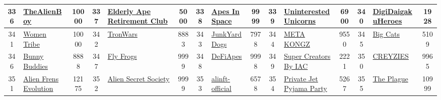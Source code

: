 \begin{table*}[]
{\begin{tabular}{|c|l|c|c|l|c|c|l|c|c|l|c|c|l|c|}
        336   & \href{https://www.thealienboy.com/}{TheAlienBoy}                                   & 10000             & 337   & \href{https://earclubnft.com/}{Elderly Ape Retirement Club}                                       & 5000              & 338   & \href{https://apesinspace.io/}{Apes In Space}                                     & 9999              & 339   & \href{https://uunicorns.io}{UninterestedUnicorns}                             & 6900              & 340   & \href{https://digidaigaku.com/}{DigiDaigakuHeroes}                                        & 1928                                    \\ \hline
        341   & \href{http://womentribe.art}{Women Tribe}                                          & 10000             & 342   & \href{https://tronwars.ai}{TronWars}                                                              & 8883              & 343   & \href{http://junkyarddogs.io}{JunkYardDogs}                                       & 7978              & 344   & \href{https://themetakongz.com/}{META KONGZ}                                  & 9550              & 345   & \href{https://8lives.io/}{Big Cats}                                                       & 5109                                    \\ \hline
        346   & \href{https://bunny-buddies.com/}{Bunny Buddies}                                   & 8888              & 347   & \href{https://flyfrogs.xyz}{Fly Frogs}                                                            & 9999              & 348   & \href{http://ape.fi}{DeFiApes}                                                    & 9998              & 349   & \href{https://supercreators.io/}{Super Creators By IAC}                       & 2221              & 350   & \href{https://opensea.io/collection/creyzies}{CREYZIES}                                   & 9965                                    \\ \hline
        351   & \href{http://alienfrens.io}{Alien Frens Evolution}                                 & 12175             & 352   & \href{https://www.aliensecretsociety.com}{Alien Secret Society}                                   & 9999              & 353   & \href{http://www.alinft.io}{alinft-official}                                      & 6578              & 354   & \href{http://www.pjpp.io}{Private Jet Pyjama Party}                           & 5267              & 355   & \href{https://opensea.io/collection/slokh}{The Plague}                                    & 10999                                   \\ \hline

\end{tabular}}
\end{table*}
